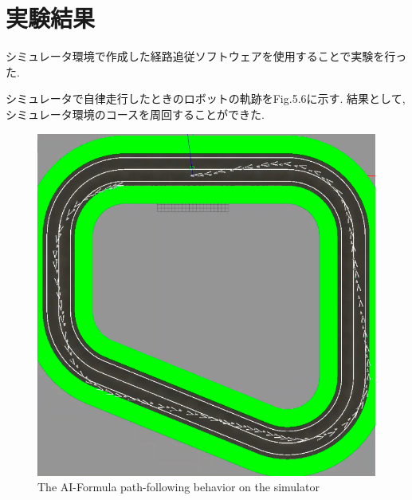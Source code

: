 \section{実験結果}
シミュレータ環境で作成した経路追従ソフトウェアを使用することで実験を行った.

シミュレータで自律走行したときのロボットの軌跡をFig.5.6に示す.
結果として, シミュレータ環境のコースを周回することができた.

\begin{figure}[H]
  \centering
 \includegraphics[keepaspectratio, scale=0.5]
      {images/simulatorfollowerpath.png}
 \caption{The AI-Formula path-following behavior on the simulator}
 \label{fig:simulatorpath}
\end{figure}